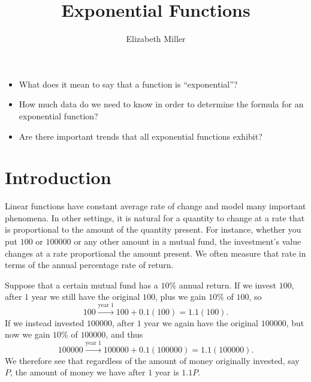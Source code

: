 \documentclass[nooutcomes]{ximera}
\author{Elizabeth Miller}
\title{Exponential Functions}
\begin{document}
\begin{abstract}
  
\end{abstract}
\maketitle



\begin{motivatingQuestions}\begin{itemize}
\item What does it mean to say that a function is ``exponential''?
\item How much data do we need to know in order to determine the formula for an exponential function?
\item Are there important trends that all exponential functions exhibit?
\end{itemize}\end{motivatingQuestions}



\section{Introduction}
Linear functions have constant average rate of change and model many important phenomena.  In other settings, it is natural for a quantity to change at a rate that is proportional to the amount of the quantity present.  For instance, whether you put \textdollar{}\(100\) or \textdollar{}\(100000\) or any other amount in a mutual fund, the investment's value changes at a rate proportional the amount present.  We often measure that rate in terms of the annual percentage rate of return.

Suppose that a certain mutual fund has a \(10\)\% annual return.  If we invest \textdollar{}\(100\), after \(1\) year we still have the original \textdollar{}\(100\), plus we gain \(10\)\% of \textdollar{}\(100\), so%
\begin{equation*}
100 \xrightarrow{\text{year } 1} 100 + 0.1(100) = 1.1(100)\text{.}
\end{equation*}
If we instead invested \textdollar{}\(100000\), after \(1\) year we again have the original \textdollar{}\(100000\), but now we gain \(10\)\% of \textdollar{}\(100000\), and thus%
\begin{equation*}
100000 \xrightarrow{\text{year } 1} 100000 + 0.1(100000) = 1.1(100000)\text{.}
\end{equation*}
We therefore see that regardless of the amount of money originally invested, say \(P\), the amount of money we have after \(1\) year is \(1.1P\).
\end{document}
